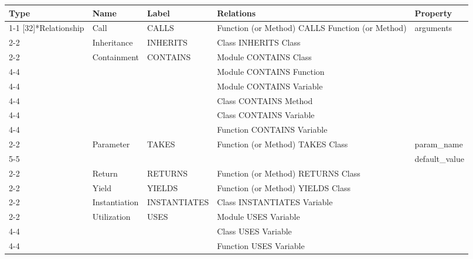 \begin{tabularx}{\textwidth}{p{1.8cm}llXl}
\toprule
\textbf{Type} & \textbf{Name} & \textbf{Label} & \textbf{Relations} & \textbf{Property} \\
\cmidrule{1-1}\cmidrule{2-2}\cmidrule{3-3}\cmidrule{4-4}\cmidrule{5-5}
\multirow{16}[32]{*}{Relationship} & Call & \textsf{CALLS} & \textsf{Function} (or \textsf{Method}) \textsf{CALLS} \textsf{Function} (or \textsf{Method}) & \textsf{arguments} \\
\cmidrule{2-2}\cmidrule{3-3}\cmidrule{4-4}\cmidrule{5-5}
 & Inheritance & \textsf{INHERITS} & \textsf{Class} \textsf{INHERITS} \textsf{Class} &  \\
\cmidrule{2-2}\cmidrule{3-3}\cmidrule{4-4}
 & \multirow{6}[12]{*}{Containment} & \multirow{6}[12]{*}{\textsf{CONTAINS}} & \textsf{Module} \textsf{CONTAINS} \textsf{Class} &  \\
\cmidrule{4-4}
 &  &  & \textsf{Module} \textsf{CONTAINS} \textsf{Function} &  \\
\cmidrule{4-4}
 &  &  & \textsf{Module} \textsf{CONTAINS} \textsf{Variable} &  \\
\cmidrule{4-4}
 &  &  & \textsf{Class} \textsf{CONTAINS} \textsf{Method} &  \\
\cmidrule{4-4}
 &  &  & \textsf{Class} \textsf{CONTAINS} \textsf{Variable} &  \\
\cmidrule{4-4}
 &  &  & \textsf{Function} \textsf{CONTAINS} \textsf{Variable} &  \\
\cmidrule{2-2}\cmidrule{3-3}\cmidrule{4-4}\cmidrule{5-5}
 & \multirow{2}[4]{*}{Parameter} & \multirow{2}[4]{*}{\textsf{TAKES}} & \multirow{2}[4]{*}{\textsf{Function} (or \textsf{Method}) \textsf{TAKES} \textsf{Class}} & \textsf{param\_\textsf{name}} \\
\cmidrule{5-5}
 &  &  &  & \textsf{default\_value} \\
\cmidrule{2-2}\cmidrule{3-3}\cmidrule{4-4}\cmidrule{5-5}
 & Return & \textsf{RETURNS} & \textsf{Function} (or \textsf{Method}) \textsf{RETURNS} \textsf{Class} &  \\
\cmidrule{2-2}\cmidrule{3-3}\cmidrule{4-4}
 & Yield & \textsf{YIELDS} & \textsf{Function} (or \textsf{Method}) \textsf{YIELDS} \textsf{Class} &  \\
\cmidrule{2-2}\cmidrule{3-3}\cmidrule{4-4}
 & Instantiation & \textsf{INSTANTIATES} & \textsf{Class} \textsf{INSTANTIATES} \textsf{Variable} &  \\
\cmidrule{2-2}\cmidrule{3-3}\cmidrule{4-4}
 & \multirow{3}[6]{*}{Utilization} & \multirow{3}[6]{*}{\textsf{USES}} & \textsf{Module} \textsf{USES} \textsf{Variable} &  \\
\cmidrule{4-4}
 &  &  & \textsf{Class} \textsf{USES} \textsf{Variable} &  \\
\cmidrule{4-4}
 &  &  & \textsf{Function} \textsf{USES} \textsf{Variable} &  \\
\bottomrule
\end{tabularx}

